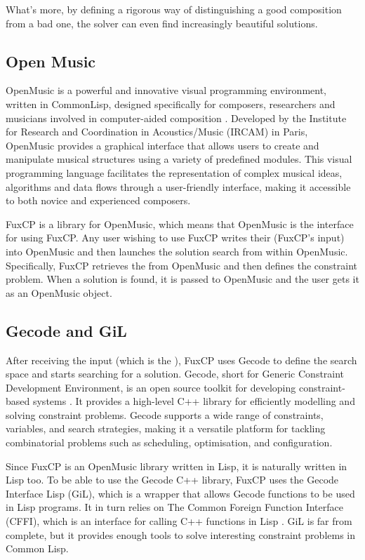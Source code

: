 What's more, by defining a rigorous way of distinguishing a good composition from a bad one, the solver can even find increasingly beautiful solutions.

\subsection{Open Music}
OpenMusic is a powerful and innovative visual programming environment, written in CommonLisp, designed specifically for composers, researchers and musicians involved in computer-aided composition \cite{OpenMusic}. Developed by the Institute for Research and Coordination in Acoustics/Music (IRCAM) in Paris, OpenMusic provides a graphical interface that allows users to create and manipulate musical structures using a variety of predefined modules. This visual programming language facilitates the representation of complex musical ideas, algorithms and data flows through a user-friendly interface, making it accessible to both novice and experienced composers. 


FuxCP is a library for OpenMusic, which means that OpenMusic is the interface for using FuxCP. Any user wishing to use FuxCP writes their \cfs (FuxCP's input) into OpenMusic and then launches the solution search from within OpenMusic. Specifically, FuxCP retrieves the \cfs from OpenMusic and then defines the constraint problem. When a solution is found, it is passed to OpenMusic and the user gets it as an OpenMusic object.

\subsection{Gecode and GiL}
After receiving the input (which is the \cf), FuxCP uses Gecode to define the search space and starts searching for a solution. Gecode, short for Generic Constraint Development Environment, is an open source toolkit for developing constraint-based systems \cite{Gecode}. It provides a high-level C++ library for efficiently modelling and solving constraint problems. Gecode supports a wide range of constraints, variables, and search strategies, making it a versatile platform for tackling combinatorial problems such as scheduling, optimisation, and configuration. 


Since FuxCP is an OpenMusic library written in Lisp, it is naturally written in Lisp too. To be able to use the Gecode C++ library, FuxCP uses the Gecode Interface Lisp (GiL), which is a wrapper that allows Gecode functions to be used in Lisp programs. It in turn relies on The Common Foreign Function Interface (CFFI), which is an interface for calling C++ functions in Lisp \cite{CFFI}.  GiL is far from complete, but it provides enough tools to solve interesting constraint problems in Common Lisp.

